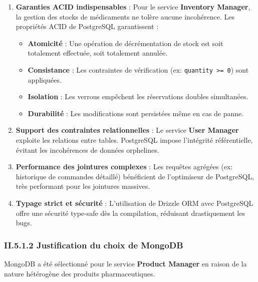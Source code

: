 \begin{enumerate}[label=\alph*)]
    \item \textbf{Garanties ACID indispensables} : Pour le service \textbf{Inventory Manager}, la gestion des stocks de médicaments ne tolère aucune incohérence. Les propriétés ACID de PostgreSQL garantissent :
    \begin{itemize}
        \item \textbf{Atomicité} : Une opération de décrémentation de stock est soit totalement effectuée, soit totalement annulée.
        \item \textbf{Consistance} : Les contraintes de vérification (ex: \texttt{quantity >= 0}) sont appliquées.
        \item \textbf{Isolation} : Les verrous empêchent les réservations doubles simultanées.
        \item \textbf{Durabilité} : Les modifications sont persistées même en cas de panne.
    \end{itemize}

    \item \textbf{Support des contraintes relationnelles} : Le service \textbf{User Manager} exploite les relations entre tables. PostgreSQL impose l'intégrité référentielle, évitant les incohérences de données orphelines.

    \item \textbf{Performance des jointures complexes} : Les requêtes agrégées (ex: historique de commandes détaillé) bénéficient de l'optimiseur de PostgreSQL, très performant pour les jointures massives.

    \item \textbf{Typage strict et sécurité} : L'utilisation de Drizzle ORM avec PostgreSQL offre une sécurité type-safe dès la compilation, réduisant drastiquement les bugs.
\end{enumerate}

\subsubsection{II.5.1.2 Justification du choix de MongoDB}

MongoDB a été sélectionné pour le service \textbf{Product Manager} en raison de la nature hétérogène des produits pharmaceutiques.


